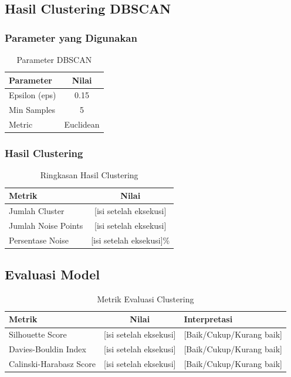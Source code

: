 \documentclass[12pt,a4paper]{article}
\begin{document}
\subsection{Hasil Clustering DBSCAN}

\subsubsection{Parameter yang Digunakan}
\begin{table}[H]
\centering
\caption{Parameter DBSCAN}
\begin{tabular}{|l|c|}
\hline
\textbf{Parameter} & \textbf{Nilai} \\
\hline
Epsilon (eps) & 0.15 \\
Min Samples & 5 \\
Metric & Euclidean \\
\hline
\end{tabular}
\end{table}

\subsubsection{Hasil Clustering}
\begin{table}[H]
\centering
\caption{Ringkasan Hasil Clustering}
\begin{tabular}{|l|c|}
\hline
\textbf{Metrik} & \textbf{Nilai} \\
\hline
Jumlah Cluster & [isi setelah eksekusi] \\
Jumlah Noise Points & [isi setelah eksekusi] \\
Persentase Noise & [isi setelah eksekusi]\% \\
\hline
\end{tabular}
\end{table}

\subsection{Evaluasi Model}

\begin{table}[H]
\centering
\caption{Metrik Evaluasi Clustering}
\begin{tabular}{|l|c|l|}
\hline
\textbf{Metrik} & \textbf{Nilai} & \textbf{Interpretasi} \\
\hline
Silhouette Score & [isi setelah eksekusi] & [Baik/Cukup/Kurang baik] \\
Davies-Bouldin Index & [isi setelah eksekusi] & [Baik/Cukup/Kurang baik] \\
Calinski-Harabasz Score & [isi setelah eksekusi] & [Baik/Cukup/Kurang baik] \\
\hline
\end{tabular}
\end{table}
\end{document}
